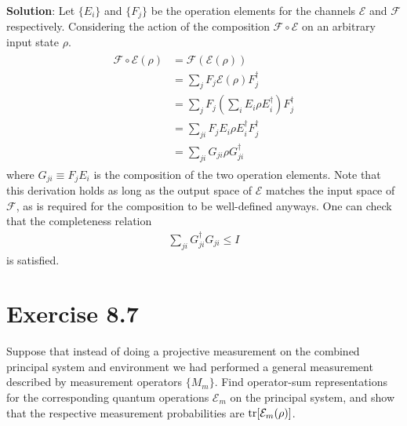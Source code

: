 \documentclass{book}
\newcommand{\mc}[1]{\mathcal{#1}}
\begin{document}
    \textbf{Solution}: Let $\{E_i\}$ and $\{F_j\}$ be the operation elements for the channels $\mc{E}$ and $\mc{F}$ respectively. Considering the action of the composition $\mc{F} \circ \mc{E}$ on an arbitrary input state $\rho$.
    \begin{align}
    \begin{aligned}
        \mc{F}\circ\mc{E} (\rho) &= \mc{F}(\mc{E}(\rho)) \\
        &= \sum_j F_j \mc{E}(\rho) F_j^\dagger \\
        &= \sum_j F_j \left(\sum_i E_i \rho E_i^\dagger \right) F_j^\dagger \\
        &= \sum_{ji} F_j E_i \rho E_i^\dagger F_j^\dagger \\
        &= \sum_{ji} G_{ji} \rho G_{ji}^\dagger 
    \end{aligned}
    \end{align}
    where $G_{ji} \equiv F_j E_i$ is the composition of the two operation elements. Note that this derivation holds as long as the output space of $\mc{E}$ matches the input space of $\mc{F}$, as is required for the composition to be well-defined anyways. One can check that the completeness relation
    \begin{align}
        \sum_{ji}G_{ji}^\dagger G_{ji} \leq I 
    \end{align}
    is satisfied.

\section*{Exercise 8.7}
    Suppose that instead of doing a projective measurement on the combined principal system and environment we had performed a general measurement described by measurement operators $\{M_m\}$. Find operator-sum representations for the corresponding quantum operations $\mathcal{E}_m$ on the principal system, and show that the respective measurement probabilities are $\tr[\mathcal{E}_m(\rho)]$.
\end{document}
